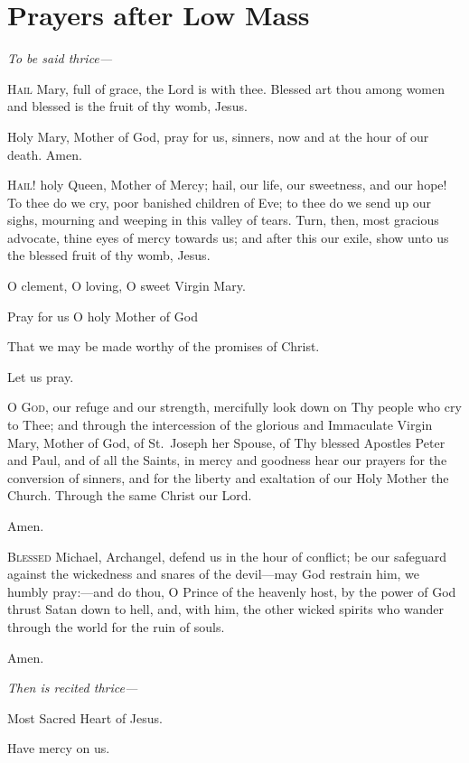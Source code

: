 \section{Prayers after Low Mass}

\label{HailMary}

{\emph{To be said thrice---}\par}
\lettrine{H}{ail} Mary, full of grace, the Lord is with thee.  Blessed art thou among women and blessed is the fruit of thy womb, Jesus.

Holy Mary, Mother of God, pray for us, sinners, now and at the hour of our death.  Amen.

\smallskip

\label{HailHolyQueen}
\lettrine{H}{ail!} holy Queen, Mother of Mercy; hail, our life, our
sweetness, and our hope! To thee do we cry, poor
banished children of Eve; to thee do we send up our
sighs, mourning and weeping in this valley of tears. Turn,
then, most gracious advocate, thine eyes of mercy
towards us; and after this our exile, show unto us the
blessed fruit of thy womb, Jesus.

O clement, O loving, O sweet Virgin Mary.

\bigskip

\Vbar Pray for us O holy Mother of God

\Rbar That we may be made worthy of the promises of Christ.

\smallskip

Let us pray.

\lettrine{O}{ God,} our refuge and our strength, mercifully look
down on Thy people who cry to Thee; and through
the intercession of the glorious and Immaculate Virgin
Mary, Mother of God, of St.~Joseph her Spouse, of Thy
blessed Apostles Peter and Paul, and of all the Saints,
in mercy and goodness hear our prayers for the conversion 
of sinners, and for the liberty and exaltation of our
Holy Mother the Church. Through the same Christ our
Lord.

\Rbar Amen.

\smallskip

\lettrine{B}{lessed} Michael, Archangel, defend us in the hour of
conflict; be our safeguard against the wickedness
and snares of the devil---may God restrain him, we
humbly pray:---and do thou, O Prince of the heavenly
host, by the power of God thrust Satan down to hell,
and, with him, the other wicked spirits who wander
through the world for the ruin of souls.

\Rbar Amen.

\smallskip

\textit{Then is recited thrice---}

\Vbar Most Sacred Heart of Jesus.

\Rbar Have mercy on us.


